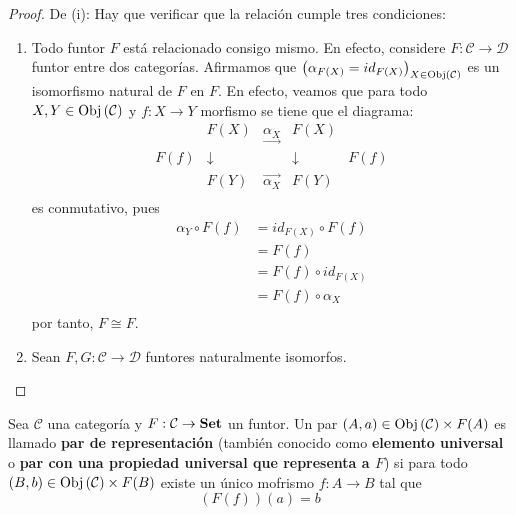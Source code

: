 \documentclass[12pt]{report}
\theoremstyle{largebreak}
\newcommand\cf[3]{\ensuremath{#1:#2\rightarrow#3}}
\newcommand{\Obj}[1]{\ensuremath{\textup{Obj}\left(#1\right)}}
\newcommand{\Cat}[1]{\ensuremath{\textup{\textbf{#1}}}}
\begin{document}
    \begin{proof}
        De (i): Hay que verificar que la relación cumple tres condiciones:
        \begin{enumerate}
            \item Todo funtor $F$ está relacionado consigo mismo. En efecto, considere $\cf{F}{\mathcal{C}}{\mathcal{D}}$ funtor entre dos categorías. Afirmamos que $\left(\alpha_{ F(X)}=id_{ F(X)} \right)_{ X\in\Obj{\mathcal{C}}}$ es un isomorfismo natural de $F$ en $F$. En efecto, veamos que para todo $X,Y\in\Obj{\mathcal{C}}$ y $\cf{f}{X}{Y}$ morfismo se tiene que el diagrama:
            \begin{equation*}
                \begin{array}{rcccl}
                    & F(X) & \underset{\longrightarrow}{\alpha_{X}} & F(X) &\\
                    F(f) & \downarrow & & \downarrow & F(f) \\
                    & F(Y) & \overset{\longrightarrow}{\alpha_{X}} & F(Y) &\\
                \end{array}
            \end{equation*}
             es conmutativo, pues
             \begin{equation*}
                \begin{split}
                    \alpha_Y\circ F(f)&=id_{F(X)}\circ F(f)\\
                    &=F(f)\\
                    &=F(f)\circ id_{F(X)}\\
                    &=F(f)\circ \alpha_X\\
                \end{split}
             \end{equation*}
             por tanto, $F\cong F$.
             \item Sean $\cf{F,G}{\mathcal{C}}{\mathcal{D}}$ funtores naturalmente isomorfos.
        \end{enumerate}
    \end{proof}

    \begin{mydef}
        Sea $\mathcal{C}$ una categoría y $\cf{F}{\mathcal{C}}{\Cat{Set}}$ un funtor. Un par $(A,a)\in\Obj{\mathcal{C}}\times F(A)$ es llamado \textbf{par de representación} (también conocido como \textbf{elemento universal} o \textbf{par con una propiedad universal que representa a $F$}) si para todo $(B,b)\in\Obj{\mathcal{C}}\times F(B)$ existe un único mofrismo $\cf{f}{A}{B}$ tal que
        \begin{equation*}
            \left(F(f)\right)(a)=b
        \end{equation*}
    \end{mydef}
\end{document}
